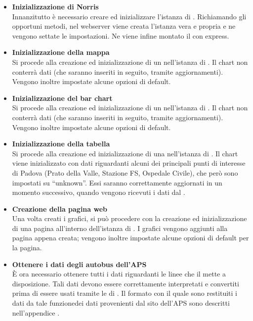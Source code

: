         \begin{itemize}

            \item \textbf{Inizializzazione di Norris} \\
            Innanzitutto è necessario creare ed inizializzare l'istanza di . Richiamando gli opportuni metodi, nel webserver viene creata l'istanza vera e propria e ne vengono settate le impostazioni. Ne viene infine montato il  con express.
            
            \item \textbf{Inizializzazione della mappa} \\
            Si procede alla creazione ed inizializzazione di un  nell'istanza di . Il chart non conterrà dati (che saranno inseriti in seguito, tramite aggiornamenti). Vengono inoltre impostate alcune opzioni di default. 
            
            \item \textbf{Inizializzazione del bar chart} \\
            Si procede alla creazione ed inizializzazione di un  nell'istanza di . Il chart non conterrà dati (che saranno inseriti in seguito, tramite aggiornamenti). Vengono inoltre impostate alcune opzioni di default.
                        
            \item \textbf{Inizializzazione della tabella} \\
            Si procede alla creazione ed inizializzazione di una  nell'istanza di . Il chart viene inizializzato con dati riguardanti alcuni dei principali punti di interesse di Padova (Prato della Valle, Stazione FS, Ospedale Civile), che però sono impostati su “unknown”. Essi saranno correttamente aggiornati in un momento successivo, quando vengono ricevuti i dati dal  .
            
            \item \textbf{Creazione della pagina web} \\
            Una volta creati i grafici, si può procedere con la creazione ed inizializzazione di una pagina all'interno dell'istanza di . I grafici vengono aggiunti alla pagina appena creata; vengono inoltre impostate alcune opzioni di default per la pagina.
            
            \item \textbf{Ottenere i dati degli autobus dell'APS} \\
            È ora necessario ottenere tutti i dati riguardanti le linee che il   mette a disposizione. Tali dati devono essere correttamente interpretati e convertiti prima di essere usati tramite le  di . Il formato con il quale sono restituiti i dati da tale funzionedei dati provenienti dal sito dell'APS sono descritti nell'appendice .
            

\end{itemize}
